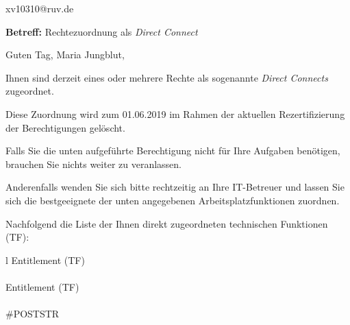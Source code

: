 \documentclass[a4paper,landscape,12pt]{letter}
\begin{document}
\begin{letter}{xv10310@ruv.de\hfill \break}
\begin{normalsize}
	\opening{\textbf{Betreff:} Rechtezuordnung als \emph{Direct Connect}}
	\begin{normalsize} \hfill
	\end{normalsize}

	\begin{normalsize}
		Guten Tag, 
	Maria Jungblut, \hfill \break
	\end{normalsize}
	\end{normalsize}
	
\begin{normalsize}
	Ihnen sind derzeit eines oder mehrere Rechte als sogenannte \emph{Direct Connects} zugeordnet.
	
	Diese Zuordnung wird zum 01.06.2019 im Rahmen der aktuellen Rezertifizierung der Berechtigungen gelöscht.
	
	Falls Sie die unten aufgeführte Berechtigung nicht für Ihre Aufgaben benötigen, 
	brauchen Sie nichts weiter zu veranlassen.
	
	Anderenfalls wenden Sie sich bitte rechtzeitig an Ihre IT-Betreuer 
	und lassen Sie sich die bestgeeignete der unten angegebenen Arbeitsplatzfunktionen zuordnen.
	\end{normalsize}
	
\begin{normalsize}
	Nachfolgend die Liste der Ihnen direkt zugeordneten technischen Funktionen (TF):

	\begin{longtable}{l}
		Entitlement (TF) \\ \hline
		\endfirsthead
		\\\hline
		Entitlement (TF) \\ \hline
		\endhead %
		\multicolumn{1}{r@{}}{Fortsetzung \ldots}\\
		\endfoot
		\hline
		\endlastfoot
	\#POSTSTR\\
	\end{longtable}
	\end{normalsize}
	

\end{letter}
\end{document}
